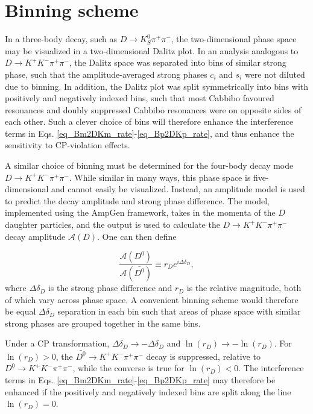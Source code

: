 \documentclass[12pt, a4paper, notitlepage, onecolumn]{article}
\numberwithin{equation}{section}
\begin{document}
\section{Binning scheme}
\label{section_binning_scheme}
\noindent In a three-body decay, such as $D\to K_S^0\pi^+\pi^-$, the two-dimensional phase space may be visualized in a two-dimensional Dalitz plot. In an analysis analogous to $D\to K^+K^-\pi^+\pi^-$, the Dalitz space was separated into bins of similar strong phase, such that the amplitude-averaged strong phases $c_i$ and $s_i$ were not diluted due to binning. In addition, the Dalitz plot was split symmetrically into bins with positively and negatively indexed bins, such that most Cabbibo favoured resonances and doubly suppressed Cabbibo resonances were on opposite sides of each other. Such a clever choice of bins will therefore enhance the interference terms in Eqs. \eqref{eq_Bm2DKm_rate}-\eqref{eq_Bp2DKp_rate}, and thus enhance the sensitivity to CP-violation effects.

A similar choice of binning must be determined for the four-body decay mode $D\to K^+K^-\pi^+\pi^-$. While similar in many ways, this phase space is five-dimensional and cannot easily be visualized. Instead, an amplitude model is used to predict the decay amplitude and strong phase difference. The model, implemented using the AmpGen framework, takes in the momenta of the $D$ daughter particles, and the output is used to calculate the $D\to K^+K^-\pi^+\pi^-$ decay amplitude $\mathcal{A}(D)$. One can then define

\begin{equation}
  \frac{\mathcal{A}(D^0)}{\mathcal{A}(\bar{D^0})}\equiv r_De^{i\Delta\delta_D},
\end{equation}
where $\Delta\delta_D$ is the strong phase difference and $r_D$ is the relative magnitude, both of which vary across phase space. A convenient binning scheme would therefore be equal $\Delta\delta_D$ separation in each bin such that areas of phase space with similar strong phases are grouped together in the same bins.

Under a CP transformation, $\Delta\delta_D\to -\Delta\delta_D$ and $\ln(r_D)\to -\ln(r_D)$. For $\ln(r_D) > 0$, the $\bar{D^0}\to K^+K^-\pi^+\pi^-$ decay is suppressed, relative to $D^0\to K^+K^-\pi^+\pi^-$, while the converse is true for $\ln(r_D) < 0$. The interference terms in Eqs. \eqref{eq_Bm2DKm_rate}-\eqref{eq_Bp2DKp_rate} may therefore be enhanced if the positively and negatively indexed bins are split along the line $\ln(r_D) = 0$.
\end{document}
